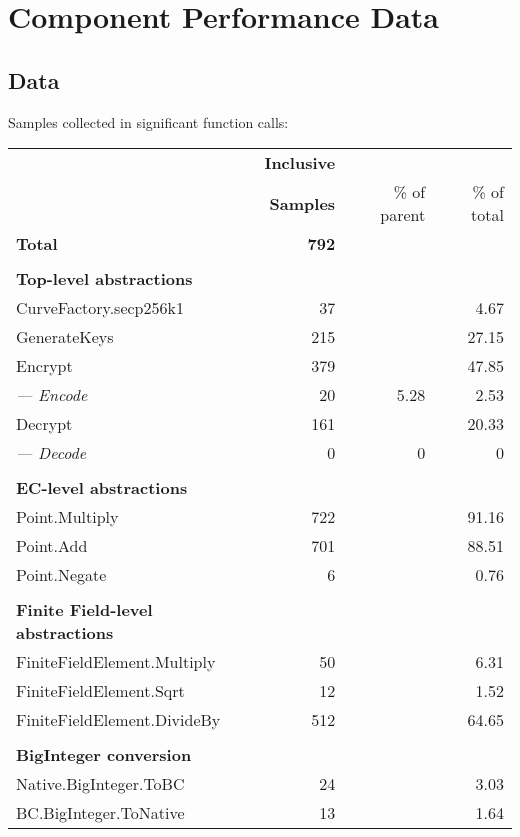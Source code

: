 \section{Component Performance Data}
\label{app:component-performance-data}

\subsection{Data}

Samples collected in significant function calls:

\begin{tabular}{|l|r|r|r|}
	\hline
	& \textbf{Inclusive} && \\
	& \textbf{Samples} & \% of parent & \% of total \\
	\hline
	\textbf{Total} & \textbf{792} && \\
	\hline
	&&& \\
	\textbf{Top-level abstractions} &&& \\
	CurveFactory.secp256k1 & 37 && 4.67 \\
	GenerateKeys & 215 && 27.15 \\
	Encrypt & 379 && 47.85 \\
	\emph{--- Encode} & 20 & 5.28 & 2.53 \\
	Decrypt & 161 && 20.33 \\
	\emph{--- Decode} & 0 & 0 & 0 \\
	\hline
	&&& \\
	\textbf{EC-level abstractions} &&& \\
	Point.Multiply & 722 && 91.16 \\
	Point.Add & 701 && 88.51 \\
	Point.Negate & 6 && 0.76 \\
	\hline
	&&& \\
	\textbf{Finite Field-level abstractions} &&& \\
	FiniteFieldElement.Multiply & 50 && 6.31 \\
	FiniteFieldElement.Sqrt & 12 && 1.52 \\
	FiniteFieldElement.DivideBy & 512 && 64.65 \\
	\hline
	&&& \\
	\textbf{BigInteger conversion} &&& \\
	Native.BigInteger.ToBC & 24 && 3.03 \\
	BC.BigInteger.ToNative & 13 && 1.64 \\
	\hline
\end{tabular}

